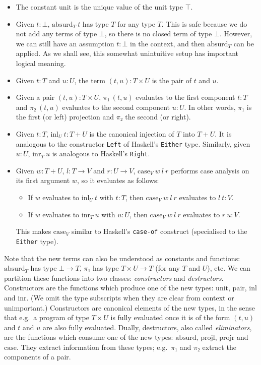 \documentclass{article}
\theoremstyle{definition}
\newcommand{\unit}{\mathrm{unit}}
\newcommand{\absurd}{\mathrm{absurd}}
\newcommand{\pair}{\mathrm{pair}}
\newcommand{\projl}{\ensuremath{\mathrm{projl}}}
\newcommand{\projr}{\ensuremath{\mathrm{projr}}}
\newcommand{\inl}{\ensuremath{\mathrm{inl}}}
\newcommand{\inr}{\ensuremath{\mathrm{inr}}}
\newcommand{\case}{\mathrm{case}}
\begin{document}
\begin{itemize}
  \item The constant $\unit$ is the unique value of the unit type $⊤$.
  \item Given $t : ⊥$, $\absurd_{T}~t$ has type $T$ for any type $T$.
        This is safe because we do not add any terms of type $⊥$, so there is no closed term of type $⊥$.
        However, we can still have an assumption $t :  ⊥$ in the context, and then $\absurd_{T}$ can be applied.
        As we shall see, this somewhat unintuitive setup has important logical meaning.
  \item Given $t : T$ and $u : U$, the term $(t, u) : T × U$ is the pair of $t$ and $u$.
  \item Given a pair $(t, u) : T × U$, $π₁~(t, u)$ evaluates to the first component $t : T$ and $π₂~(t, u)$ evaluates to the second component $u : U$.
        In other words, $π₁$ is the first (or left) projection and $π₂$ the second (or right).
  \item Given $t : T$, $\inl_{U}~t : T + U$ is the canonical injection of $T$ into $T + U$.
        It is analogous to the constructor \texttt{Left} of Haskell's \texttt{Either} type.
        Similarly, given $u : U$, $\inr_{T}~u$ is analogous to Haskell's \texttt{Right}.
  \item Given $w : T + U$, $l : T → V$ and $r : U → V$, $\case_{V}~w~l~r$ performs case analysis on its first argument $w$, so it evaluates as follows:
        \begin{itemize}
          \item If $w$ evaluates to $\inl_{U}~t$ with $t : T$, then $\case_{V}~w~l~r$ evaluates to $l~t : V$.
          \item If $w$ evaluates to $\inr_{T}~u$ with $u : U$, then $\case_{V}~w~l~r$ evaluates to $r~u : V$.
        \end{itemize}
        This makes $\case_{V}$ similar to Haskell's \texttt{case-of} construct (specialised to the \texttt{Either} type).
\end{itemize}

Note that the new terms can also be understood as constants and functions: $\absurd_{T}$ has type $⊥ → T$, $π₁$ has type $T × U → T$ (for any $T$ and $U$), etc.
We can partition these functions into two classes: \emph{constructors} and \emph{destructors}.
Constructors are the functions which produce one of the new types: $\unit$, $\pair$, $\inl$ and $\inr$.
(We omit the type subscripts when they are clear from context or unimportant.)
Constructors are canonical elements of the new types, in the sense that e.g.\ a program of type $T × U$ is fully evaluated once it is of the form $(t,u)$ and $t$ and $u$ are also fully evaluated.
Dually, destructors, also called \emph{eliminators}, are the functions which consume one of the new types: $\absurd$, $\projl$, $\projr$ and $\case$.
They extract information from these types; e.g.\ $π₁$ and $π₂$ extract the components of a pair.
\end{document}
